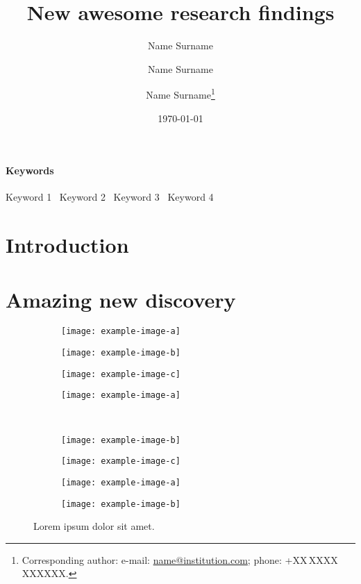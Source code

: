 \documentclass[10pt,a4paper]{article}
\title{New awesome research findings}
\author[1]{Name Surname}
\author[2]{Name Surname}
\author[1]{Name Surname\footnote{Corresponding author: e-mail: \href{mailto:name@institution.com}{name@institution.com}; phone: +XX\,XXXX\,XXXXXX.}}
\affil[1]{Department of Amazing Science, University of Something, Somewhere, Somewhere}
\date{\today} %
\begin{document}
\maketitle

\begin{abstract}
    \noindent
    \lipsum[1]
\end{abstract}

\paragraph{Keywords}
Keyword 1 \textperiodcentered\
Keyword 2 \textperiodcentered\
Keyword 3 \textperiodcentered\
Keyword 4


\section{Introduction}
\label{sec:introduction}
% 
\lipsum[1-3]


\section{Amazing new discovery}
\label{sec:new_discovery}
% 
\lipsum[4]

\begin{figure}[htb]
    \centering
    \begin{subfigure}{0.24\textwidth}
        \centering
        \texttt{[image: example-image-a]}
    \end{subfigure}
    \begin{subfigure}{0.24\textwidth}
        \centering
        \texttt{[image: example-image-b]}
    \end{subfigure}
    \begin{subfigure}{0.24\textwidth}
        \centering
        \texttt{[image: example-image-c]}
    \end{subfigure}
    \begin{subfigure}{0.24\textwidth}
        \centering
        \texttt{[image: example-image-a]}
    \end{subfigure}\\
    \vspace{0.01\linewidth}
    \begin{subfigure}{0.24\textwidth}
        \centering
        \texttt{[image: example-image-b]}
    \end{subfigure}
    \begin{subfigure}{0.24\textwidth}
        \centering
        \texttt{[image: example-image-c]}
    \end{subfigure}
    \begin{subfigure}{0.24\textwidth}
        \centering
        \texttt{[image: example-image-a]}
    \end{subfigure}
    \begin{subfigure}{0.24\textwidth}
        \centering
        \texttt{[image: example-image-b]}
    \end{subfigure}
    \caption{
        Lorem ipsum dolor sit amet.
    }
\end{figure}
\end{document}
